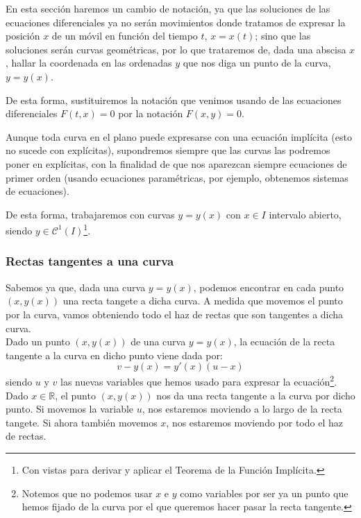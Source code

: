 \begin{notacion}
    En esta sección haremos un cambio de notación, ya que las soluciones de las ecuaciones diferenciales ya no serán movimientos donde tratamos de expresar la posición $x$ de un móvil en función del tiempo $t$, $x = x(t)$; sino que las soluciones serán curvas geométricas, por lo que trataremos de, dada una abscisa $x$, hallar la coordenada en las ordenadas $y$ que nos diga un punto de la curva, $y = y(x)$.

    De esta forma, sustituiremos la notación que venimos usando de las ecuaciones diferenciales $F(t,x) = 0$ por la notación $F(x,y) = 0$.
\end{notacion}

Aunque toda curva en el plano puede expresarse con una ecuación implícita (esto no sucede con explícitas), supondremos siempre que las curvas las podremos poner en explícitas, con la finalidad de que nos aparezcan siempre ecuaciones de primer orden (usando ecuaciones paramétricas, por ejemplo, obtenemos sistemas de ecuaciones).

De esta forma, trabajaremos con curvas $y=y(x)$ con $x\in I$ intervalo abierto, siendo $y\in \mathcal{C}^1(I)$\footnote{Con vistas para derivar y aplicar el Teorema de la Función Implícita.}.

\subsubsection{Rectas tangentes a una curva}
Sabemos ya que, dada una curva $y = y(x)$, podemos encontrar en cada punto $(x,y(x))$ una recta tangete a dicha curva. A medida que movemos el punto por la curva, vamos obteniendo todo el haz de rectas que son tangentes a dicha curva.\\

Dado un punto $(x,y(x))$ de una curva $y=y(x)$, la ecuación de la recta tangente a la curva en dicho punto viene dada por:
\begin{equation*}
    v-y(x) = y'(x) (u-x)
\end{equation*}
siendo $u$ y $v$ las nuevas variables que hemos usado para expresar la ecuación\footnote{Notemos que no podemos usar $x$ e $y$ como variables por ser ya un punto que hemos fijado de la curva por el que queremos hacer pasar la recta tangente.}.\\

Dado $x\in \mathbb{R}$, el punto $(x,y(x))$ nos da una recta tangente a la curva por dicho punto. Si movemos la variable $u$, nos estaremos moviendo a lo largo de la recta tangete. Si ahora también movemos $x$, nos estaremos moviendo por todo el haz de rectas.


